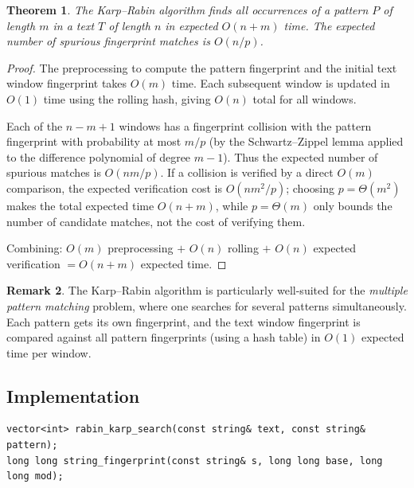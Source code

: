 \documentclass[twoside,12pt]{book}
\theoremstyle{plain}
\newtheorem{theorem}{Theorem}[chapter]
\theoremstyle{definition}
\newtheorem{remark}[theorem]{Remark}
\theoremstyle{remark}
\newenvironment{cpplisting}{\begin{center}\small}{\end{center}}
\begin{document}
\begin{theorem}
\label{thm:karp-rabin}
The Karp--Rabin algorithm finds all occurrences of a pattern $P$ of length $m$ in a text $T$ of length $n$ in expected $O(n + m)$ time. The expected number of spurious fingerprint matches is $O(n/p)$.
\end{theorem}

\begin{proof}
The preprocessing to compute the pattern fingerprint and the initial text window fingerprint takes $O(m)$ time. Each subsequent window is updated in $O(1)$ time using the rolling hash, giving $O(n)$ total for all windows.

Each of the $n - m + 1$ windows has a fingerprint collision with the pattern
fingerprint with probability at most $m/p$ (by the Schwartz--Zippel lemma
applied to the difference polynomial of degree $m-1$). Thus the expected
number of spurious matches is $O(nm/p)$. If a collision is verified by a
direct $O(m)$ comparison, the expected verification cost is $O(nm^2/p)$;
choosing $p=\Theta(m^2)$ makes the total expected time $O(n+m)$, while
$p=\Theta(m)$ only bounds the number of candidate matches, not the cost of
verifying them.

Combining: $O(m)$ preprocessing $+$ $O(n)$ rolling $+$ $O(n)$ expected verification $= O(n + m)$ expected time.
\end{proof}

\begin{remark}
The Karp--Rabin algorithm is particularly well-suited for the \emph{multiple pattern matching} problem, where one searches for several patterns simultaneously. Each pattern gets its own fingerprint, and the text window fingerprint is compared against all pattern fingerprints (using a hash table) in $O(1)$ expected time per window.
\end{remark}

\subsection*{Implementation}

\begin{cpplisting}
\begin{lstlisting}[title={Rabin--Karp search --- \texttt{src/chapter8/rabin\_karp.h}}]
vector<int> rabin_karp_search(const string& text, const string& pattern);
long long string_fingerprint(const string& s, long long base, long long mod);
\end{lstlisting}
\end{cpplisting}
\end{document}
